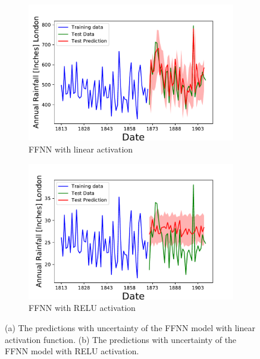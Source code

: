 \documentclass[10pt,a4paper]{article}
\begin{document}
\begin{figure}[h]
\centering
\begin{subfigure}{.5\textwidth}
  \centering
  \includegraphics[scale=0.41]{Annual_Rainfall_NN_linear.pdf}
  \caption{FFNN with linear activation}
  \label{fig:NN results EURO_USD}
\end{subfigure}%
\begin{subfigure}{.5\textwidth}
  \centering
  \includegraphics[scale=0.41]{Annual_Rainfall_NN_relu.pdf}
  \caption{FFNN with RELU activation}
  \label{fig:LSTM results EURO_USD}
\end{subfigure}
\caption{(a) The predictions with uncertainty of the FFNN model with linear activation function. (b) The predictions with uncertainty of the FFNN model with RELU activation.}
\label{fig:results EURO_USD}
\end{figure}
\end{document}
